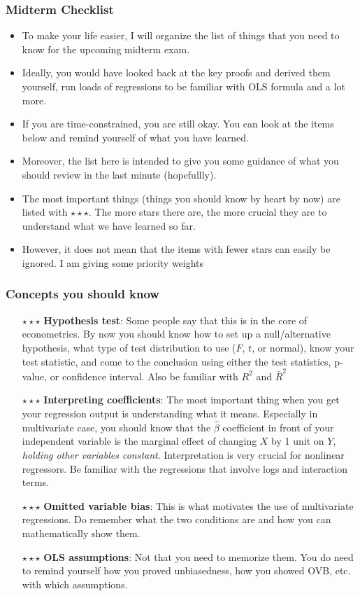 \documentclass[aspectratio=169]{beamer}
\begin{document}
\begin{frame}
\frametitle{Midterm Checklist}
\begin{itemize} 
\item To make your life easier, I will organize the list of things that you need to know for the upcoming midterm exam. 
\item Ideally, you would have looked back at the key proofs and derived them yourself, run loads of regressions to be familiar with OLS formula and a lot more.
\item If you are time-constrained, you are still okay. You can look at the items below and remind yourself of what you have learned.
\item Moreover, the list here is intended to give you some guidance of what you should review in the last minute (hopefullly). 
\item The most important things (things you should know by heart by now) are listed with $\star\star\star$. The more stars there are, the more crucial they are to understand what we have learned so far. 
\item However, it does not mean that the items with fewer stars can easily be ignored. I am giving some priority weights
\end{itemize}
\end{frame}

\begin{frame}
\frametitle{Concepts you should know}
\begin{itemize} 
\item[$\star\star\star$] \textbf{Hypothesis test}: Some people say that this is in the core of econometrics. By now you should know how to set up a null/alternative hypothesis, what type of test distribution to use ($F$, $t$, or normal), know your test statistic, and come to the conclusion using either the test statistics, p-value, or confidence interval. Also be familiar with $R^2$ and $\bar{R}^2$
\item[$\star\star\star$] \textbf{Interpreting coefficients}: The most important thing when you get your regression output is understanding what it means. Especially in multivariate case, you should know that the $\hat{\beta}$ coefficient in front of your independent variable is the marginal effect of changing $X$ by 1 unit on $Y$, \textit{holding other variables constant}. Interpretation is very crucial for nonlinear regressors. Be familiar with the regressions that involve logs and interaction terms. 
\item[$\star\star\star$]\textbf{Omitted variable bias}: This is what motivates the use of multivariate regressions. Do remember what the two conditions are and how you can mathematically show them.
\item[$\star\star\star$] \textbf{OLS assumptions}: Not that you need to memorize them. You do need to remind yourself how you proved unbiasedness, how you showed OVB, etc. with which assumptions. 
\end{itemize}
\end{frame}
\end{document}
